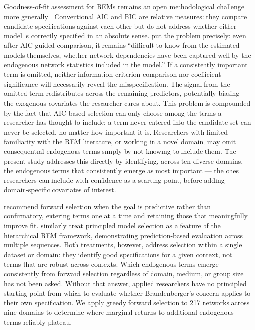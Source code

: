 \documentclass[11pt]{article}
\begin{document}
Goodness-of-fit assessment for REMs remains an open
methodological challenge more generally \citep{butts2023relational}.
Conventional AIC and BIC are relative measures: they compare candidate
specifications against each other but do not address whether either model
is correctly specified in an absolute sense. \citet{brandenberger2019predicting}
put the problem precisely: even after AIC-guided comparison, it remains
``difficult to know from the estimated models themselves, whether network
dependencies have been captured well by the endogenous network statistics
included in the model.'' If a consistently important term is omitted,
neither information criterion comparison nor coefficient significance will
necessarily reveal the misspecification. The signal from the omitted term
redistributes across the remaining predictors, potentially biasing the
exogenous covariates the researcher cares about. This problem is compounded
by the fact that AIC-based selection can only choose among the terms a
researcher has thought to include: a term never entered into the candidate
set can never be selected, no matter how important it is. Researchers with
limited familiarity with the REM literature, or working in a novel domain,
may omit consequential endogenous terms simply by not knowing to include them.
The present study addresses this directly by identifying, across ten diverse
domains, the endogenous terms that consistently emerge as most important ---
the ones researchers can include with confidence as a starting point,
before adding domain-specific covariates of interest.

\citet{pilny2016illustration} recommend forward selection when the goal is
predictive rather than confirmatory, entering terms one at a time and retaining
those that meaningfully improve fit. \citet{dubois2013hierarchical} similarly
treat principled model selection as a feature of the hierarchical REM framework,
demonstrating prediction-based evaluation across multiple sequences. Both
treatments, however, address selection within a single dataset or domain: they
identify good specifications for a given context, not terms that are robust
across contexts. Which endogenous terms emerge consistently from forward
selection regardless of domain, medium, or group size has not been asked.
Without that answer, applied researchers have no principled starting point from
which to evaluate whether Brandenberger's concern applies to their own
specification. We apply greedy forward selection to 217 networks across nine
domains to determine where marginal returns to additional endogenous terms
reliably plateau.
\end{document}
